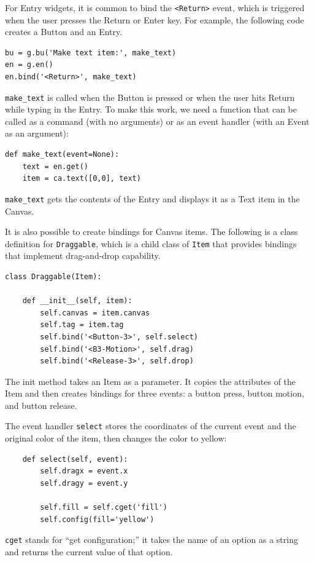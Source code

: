 \documentclass[10pt]{book}
\begin{document}
For Entry widgets, it is common to bind the \verb"<Return>" event,
which is triggered when the user presses the {\sf Return} or
{\sf Enter} key.  For example, the following code creates a Button
and an Entry.

\beforeverb
\begin{verbatim}
bu = g.bu('Make text item:', make_text)
en = g.en()
en.bind('<Return>', make_text)
\end{verbatim}
\afterverb
%
\verb"make_text" is called when the Button is pressed or when
the user hits {\sf Return} while typing in the Entry.  To make
this work, we need a function that can be called as a command
(with no arguments) or as an event handler (with an Event
as an argument):

\beforeverb
\begin{verbatim}
def make_text(event=None):
    text = en.get()
    item = ca.text([0,0], text)
\end{verbatim}
\afterverb
%
\verb"make_text" gets the contents of the Entry and displays
it as a Text item in the Canvas.

It is also possible to create bindings for Canvas items.
The following is a class definition for {\tt Draggable},
which is a child class of {\tt Item} that provides bindings
that implement drag-and-drop capability.


\beforeverb
\begin{verbatim}
class Draggable(Item):

    def __init__(self, item):
        self.canvas = item.canvas
        self.tag = item.tag
        self.bind('<Button-3>', self.select)
        self.bind('<B3-Motion>', self.drag)
        self.bind('<Release-3>', self.drop)
\end{verbatim}
\afterverb
%
The init method takes an Item as a parameter.  It copies
the attributes of the Item and then creates bindings for
three events: a button press, button motion, and button release.

The event handler {\tt select} stores the coordinates
of the current event and the original color of the item, then
changes the color to yellow:

\beforeverb
\begin{verbatim}
    def select(self, event):
        self.dragx = event.x
        self.dragy = event.y

        self.fill = self.cget('fill')
        self.config(fill='yellow')
\end{verbatim}
\afterverb
%
{\tt cget} stands for ``get configuration;'' it takes the name of an
option as a string and returns the current value of that option.
\end{document}
